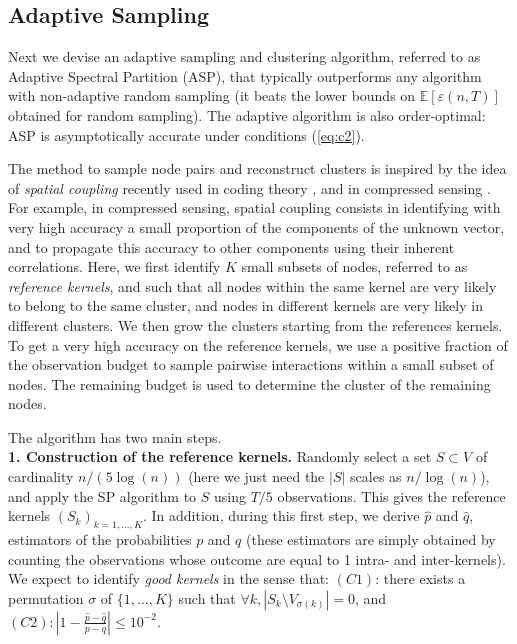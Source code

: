 \subsection{Adaptive Sampling}

Next we devise an adaptive sampling and clustering algorithm, referred to as Adaptive Spectral Partition (ASP),  that typically outperforms any algorithm with non-adaptive random sampling (it beats the lower bounds on $\mathbb{E}[\varepsilon(n,T)]$ obtained for random sampling). The adaptive algorithm is also order-optimal: ASP is asymptotically accurate under conditions (\ref{eq:c2}).

The method to sample node pairs and reconstruct clusters is inspired by the idea of {\it spatial coupling} recently used in coding theory \cite{kudekar2011}, and in compressed sensing \cite{krzakala2012}. For example, in compressed sensing, spatial coupling consists in identifying with very high accuracy a small proportion of the components of the unknown vector, and to propagate this accuracy to other components using their inherent correlations. Here, we first identify $K$ small subsets of nodes, referred to as {\it reference kernels}, and such that all nodes within the same kernel are very likely to belong to the same cluster, and nodes in different kernels are very likely in different clusters. We then grow the clusters starting from the references kernels. To get a very high accuracy on the reference kernels, we use a positive fraction of the observation budget to sample pairwise interactions within a small subset of nodes. The remaining budget is used to determine the cluster of the remaining nodes.

The algorithm has two main steps.\\
{\bf 1. Construction of the reference kernels.} Randomly select a set $S\subset V$ of cardinality $n/(5\log(n))$ (here we just need the $|S|$ scales as $n/\log(n)$), and apply the SP algorithm to $S$ using $T/5$ observations. This gives the reference kernels $(S_k)_{k=1,\ldots,K}$. In addition, during this first step, we derive $\hat{p}$ and $\hat{q}$, estimators of the probabilities $p$ and $q$ (these estimators are simply obtained by counting the observations whose outcome are equal to 1 intra- and inter-kernels). We expect to identify {\it good kernels} in the sense that: $(C1)$: there exists a permutation $\sigma$ of $\{1,\ldots,K\}$ such that $\forall k, |S_k \setminus {V}_{\sigma(k)} |=0$, and $(C2): \left|1- \frac{\hat{p}-\hat{q}}{p-q} \right| \le 10^{-2}$.

